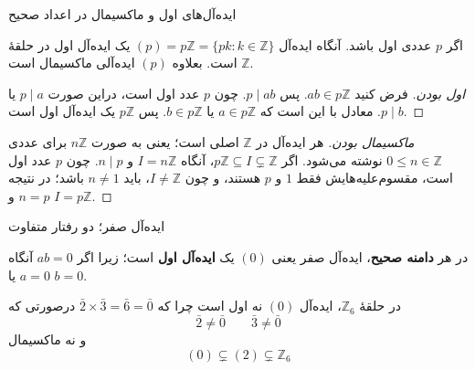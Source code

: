 \begin{frame}[t]{ایده‌آل‌های اول و ماکسیمال در اعداد صحیح}
    \begin{example}
        اگر \(p\) عددی اول باشد. آنگاه ایده‌آل \((p) = p\mathbb{Z} = \{pk : k \in \mathbb{Z}\}\) یک ایده‌آل اول در حلقهٔ \(\mathbb{Z}\) است. بعلاوه \((p)\) ایده‌آلی ماکسیمال است.
    \end{example}

    \begin{proof}[اول بودن]
        فرض کنید \(ab \in p\mathbb{Z}\). پس \(p \mid ab\). چون \(p\) عدد اول است،  دراین صورت
        \(p \mid a\) یا \(p \mid b\). معادل با این است که \(a \in p\mathbb{Z}\) یا \(b \in p\mathbb{Z}\).
        پس \(p\mathbb{Z}\) یک ایده‌آل اول است.
    \end{proof}

    \begin{proof}[ماکسیمال بودن]
        هر ایده‌آل در \(\mathbb{Z}\) اصلی است؛ یعنی به صورت \(n\mathbb{Z}\) برای عددی \(0 \leq n \in \mathbb{Z}\) نوشته می‌شود.
        اگر \(p\mathbb{Z} \subseteq I \subsetneq \mathbb{Z}\)، آنگاه \(I = n\mathbb{Z}\) و \(n \mid p\).
        چون \(p\) عدد اول است، مقسوم‌علیه‌هایش فقط \(1\) و \(p\) هستند، و چون \(I \ne \mathbb{Z}\)، باید \(n \ne 1\) باشد؛
        در نتیجه \(n = p\) و \(I = p\mathbb{Z}\).
    \end{proof}


\end{frame}

\begin{frame}[t]{ایده‌آل صفر؛ دو رفتار متفاوت}
    \begin{example}
        در هر \textbf{دامنه صحیح}، ایده‌آل صفر یعنی $(0)$ یک \textbf{ایده‌آل اول} است؛ زیرا اگر $ab = 0$ آنگاه $a = 0$ یا $b = 0$.
    \end{example}

    \begin{example}
        در حلقهٔ $\mathbb{Z}_6$، ایده‌آل $(0)$ نه اول است
        چرا که
        \(\bar{2} \times \bar{3} = \bar{6} = \bar{0}\)
        درصورتی که
        \[\bar{2} \neq \bar{0} \qquad \bar{3} \neq \bar{0}\]
        و نه ماکسیمال
        \[
            (0) \subsetneq (2) \subsetneq \mathbb{Z}_6
        \]
    \end{example}

\end{frame}




